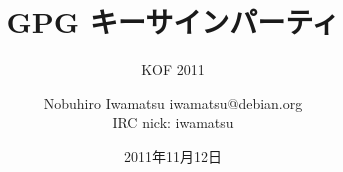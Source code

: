




\documentclass[cjk,dvipdfmx,12pt]{beamer}
\usepackage{monthlypresentation}



\title{GPG キーサインパーティ}
\subtitle{KOF 2011}
\author{Nobuhiro Iwamatsu iwamatsu@debian.org\\IRC nick: iwamatsu}
\date{2011年11月12日}



